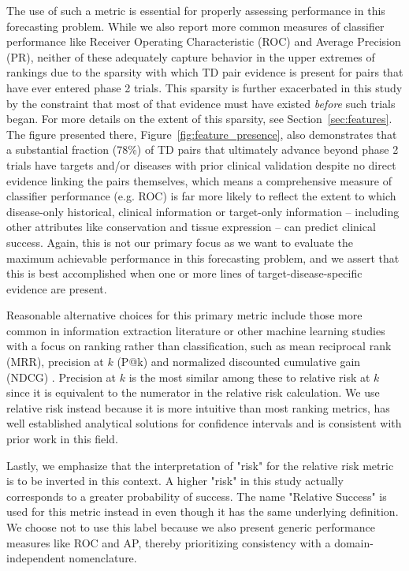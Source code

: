 \documentclass{article}
\begin{document}
The use of such a metric is essential for properly assessing performance in this forecasting problem. While we also report more common measures of classifier performance like Receiver Operating Characteristic (ROC) and Average Precision (PR), neither of these adequately capture behavior in the upper extremes of rankings due to the sparsity with which TD pair evidence is present for pairs that have ever entered phase 2 trials. This sparsity is further exacerbated in this study by the constraint that most of that evidence must have existed \textit{before} such trials began. For more details on the extent of this sparsity, see Section~\ref{sec:features}. The figure presented there, Figure~\ref{fig:feature_presence}, also demonstrates that a substantial fraction (78\%) of TD pairs that ultimately advance beyond phase 2 trials have targets and/or diseases with prior clinical validation despite no direct evidence linking the pairs themselves, which means a comprehensive measure of classifier performance (e.g. ROC) is far more likely to reflect the extent to which disease-only historical, clinical information or target-only information -- including other attributes like conservation and tissue expression -- can predict clinical success. Again, this is not our primary focus as we want to evaluate the maximum achievable performance in this forecasting problem, and we assert that this is best accomplished when one or more lines of target-disease-specific evidence are present.

Reasonable alternative choices for this primary metric include those more common in information extraction literature or other machine learning studies with a focus on ranking rather than classification, such as mean reciprocal rank (MRR), precision at $k$ (P@k) and normalized discounted cumulative gain (NDCG) \cite{hoyt2022unified,moffat2022batch}. Precision at $k$ is the most similar among these to relative risk at $k$ since it is equivalent to the numerator in the relative risk calculation. We use relative risk instead because it is more intuitive than most ranking metrics, has well established analytical solutions for confidence intervals \cite{Katz1978-mo} and is consistent with prior work in this field.

Lastly, we emphasize that the interpretation of "risk" for the relative risk metric is to be inverted in this context. A higher "risk" in this study actually corresponds to a greater probability of success. The name "Relative Success" is used for this metric instead in \cite{Minikel2023.06.23.23291765} even though it has the same underlying definition. We choose not to use this label because we also present generic performance measures like ROC and AP, thereby prioritizing consistency with a domain-independent nomenclature.
\end{document}
